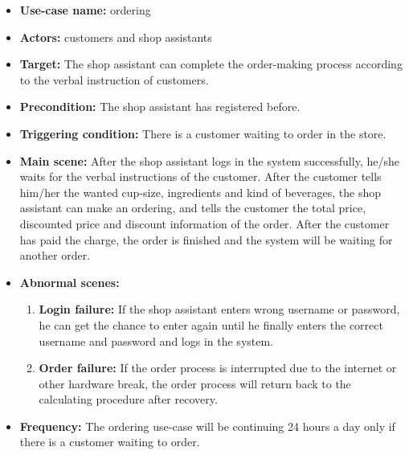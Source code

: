 \documentclass[a4paper]{report}
\begin{document}
\begin{itemize}
\item \textbf{Use-case name:} ordering
\item \textbf{Actors:} customers and shop assistants
\item \textbf{Target:} The shop assistant can complete the order-making process according to the verbal instruction of customers.
\item \textbf{Precondition:} The shop assistant has registered before. 
\item \textbf{Triggering condition:} There is a customer waiting to order in the store.
\item \textbf{Main scene:} After the shop assistant logs in the system successfully, he/she waits for the verbal instructions of the customer. After the customer tells him/her the wanted cup-size, ingredients and kind of  beverages, the shop assistant can make an ordering, and tells the customer the total price, discounted price and discount information of the order. After the customer has paid the charge, the order is finished and the system will be waiting for another order.
\item \textbf{Abnormal scenes:}
\begin{enumerate}
\item  \textbf{Login failure:} If the shop assistant enters wrong username or password, he can get the chance to enter again until he finally enters the correct username and password and logs in the system. 

\item \textbf{Order failure:} If the order process is interrupted due to the internet or other hardware break, the order process will return back to the calculating procedure after recovery.
\end{enumerate}
\item \textbf{Frequency:} The ordering use-case will be continuing 24 hours a day only if there is a customer waiting to order.
\end{itemize}
\end{document}
